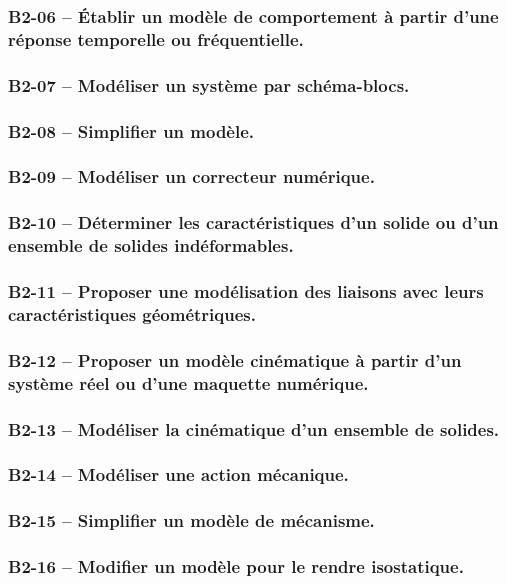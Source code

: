 \subsubsection*{B2-06 -- Établir un modèle de comportement à partir d'une réponse temporelle ou fréquentielle. }  
\subsubsection*{B2-07 -- Modéliser un système par schéma-blocs. }  
\subsubsection*{B2-08 -- Simplifier un modèle.}  
\subsubsection*{B2-09 -- Modéliser un correcteur numérique. }  
\subsubsection*{B2-10 -- Déterminer les caractéristiques d'un solide ou d'un ensemble de solides indéformables.}  
\subsubsection*{B2-11 -- Proposer une modélisation des liaisons avec leurs caractéristiques géométriques.}  
\subsubsection*{B2-12 -- Proposer un modèle cinématique à partir d'un système réel ou d'une maquette numérique.}  
\subsubsection*{B2-13 -- Modéliser la cinématique d'un ensemble de solides.}  
\subsubsection*{B2-14 -- Modéliser une action mécanique.}  
\subsubsection*{B2-15 -- Simplifier un modèle de mécanisme.}  
\subsubsection*{B2-16 -- Modifier un modèle pour le rendre isostatique.}  
